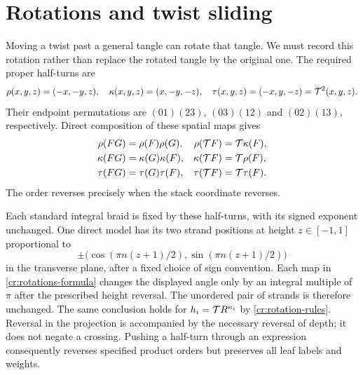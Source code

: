 \section{Rotations and twist sliding}\label{cr:rotations}

Moving a twist past a general tangle can rotate that tangle. We
must record this rotation rather than replace the rotated tangle by
the original one. The required proper half-turns are
\begin{equation}\label{cr:rotations-formula}
 \rho(x,y,z)=(-x,-y,z),\quad
 \kappa(x,y,z)=(x,-y,-z),\quad
 \tau(x,y,z)=(-x,y,-z)=\mathcal T^2(x,y,z).
\end{equation}
Their endpoint permutations are $(01)(23)$, $(03)(12)$ and $(02)(13)$, respectively. Direct composition of these spatial maps gives
\begin{equation}\label{cr:rotation-rules}
\begin{aligned}
 \rho(FG)&=\rho(F)\rho(G),&\rho(\mathcal T F)&=\mathcal T\kappa(F),\\
 \kappa(FG)&=\kappa(G)\kappa(F),&\kappa(\mathcal T F)&=\mathcal T\rho(F),\\
 \tau(FG)&=\tau(G)\tau(F),&\tau(\mathcal T F)&=\mathcal T\tau(F).
\end{aligned}
\end{equation}
The order reverses precisely when the stack coordinate reverses.

Each standard integral braid is fixed by these half-turns, with its signed exponent unchanged. One direct model has its two strand positions at height $z\in[-1,1]$ proportional to
\[
 \pm\bigl(\cos(\pi n(z+1)/2),\sin(\pi n(z+1)/2)\bigr)
\]
in the transverse plane, after a fixed choice of sign convention. Each map in \eqref{cr:rotations-formula} changes the displayed angle only by an integral multiple of $\pi$ after the prescribed height reversal. The unordered pair of strands is therefore unchanged. The same conclusion holds for $h_i=\mathcal T R^{n_i}$ by \eqref{cr:rotation-rules}. Reversal in the projection is accompanied by the necessary reversal of depth; it does not negate a crossing. Pushing a half-turn through an expression consequently reverses specified product orders but preserves all leaf labels and weights.

